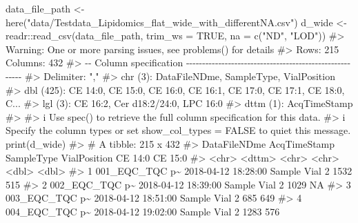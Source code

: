 \documentclass[
  letterpaper,
  DIV=11,
  numbers=noendperiod]{scrreprt}
\newenvironment{Shaded}{\begin{snugshade}}{\end{snugshade}}
\newcommand{\AttributeTok}[1]{\textcolor[rgb]{0.40,0.45,0.13}{#1}}
\newcommand{\CommentTok}[1]{\textcolor[rgb]{0.37,0.37,0.37}{#1}}
\newcommand{\ConstantTok}[1]{\textcolor[rgb]{0.56,0.35,0.01}{#1}}
\newcommand{\FunctionTok}[1]{\textcolor[rgb]{0.28,0.35,0.67}{#1}}
\newcommand{\NormalTok}[1]{\textcolor[rgb]{0.00,0.23,0.31}{#1}}
\newcommand{\OtherTok}[1]{\textcolor[rgb]{0.00,0.23,0.31}{#1}}
\newcommand{\SpecialCharTok}[1]{\textcolor[rgb]{0.37,0.37,0.37}{#1}}
\newcommand{\StringTok}[1]{\textcolor[rgb]{0.13,0.47,0.30}{#1}}
\begin{document}
\begin{Shaded}
\begin{Highlighting}[]
\NormalTok{data\_file\_path }\OtherTok{\textless{}{-}} \FunctionTok{here}\NormalTok{(}\StringTok{"data/Testdata\_Lipidomics\_flat\_wide\_with\_differentNA.csv"}\NormalTok{)}
\NormalTok{d\_wide }\OtherTok{\textless{}{-}}\NormalTok{ readr}\SpecialCharTok{::}\FunctionTok{read\_csv}\NormalTok{(data\_file\_path, }\AttributeTok{trim\_ws =} \ConstantTok{TRUE}\NormalTok{, }\AttributeTok{na =} \FunctionTok{c}\NormalTok{(}\StringTok{"ND"}\NormalTok{, }\StringTok{"LOD"}\NormalTok{))}
\CommentTok{\#\textgreater{} Warning: One or more parsing issues, see \textasciigrave{}problems()\textasciigrave{} for details}
\CommentTok{\#\textgreater{} Rows: 215 Columns: 432}
\CommentTok{\#\textgreater{} {-}{-} Column specification {-}{-}{-}{-}{-}{-}{-}{-}{-}{-}{-}{-}{-}{-}{-}{-}{-}{-}{-}{-}{-}{-}{-}{-}{-}{-}{-}{-}{-}{-}{-}{-}{-}{-}{-}{-}{-}{-}{-}{-}{-}{-}{-}{-}{-}{-}{-}{-}{-}{-}{-}{-}{-}{-}{-}{-}}
\CommentTok{\#\textgreater{} Delimiter: ","}
\CommentTok{\#\textgreater{} chr    (3): DataFileNDme, SampleType, VialPosition}
\CommentTok{\#\textgreater{} dbl  (425): CE 14:0, CE 15:0, CE 16:0, CE 16:1, CE 17:0, CE 17:1, CE 18:0, C...}
\CommentTok{\#\textgreater{} lgl    (3): CE 16:2, Cer d18:2/24:0, LPC 16:0}
\CommentTok{\#\textgreater{} dttm   (1): AcqTimeStamp}
\CommentTok{\#\textgreater{} }
\CommentTok{\#\textgreater{} i Use \textasciigrave{}spec()\textasciigrave{} to retrieve the full column specification for this data.}
\CommentTok{\#\textgreater{} i Specify the column types or set \textasciigrave{}show\_col\_types = FALSE\textasciigrave{} to quiet this message.}
\FunctionTok{print}\NormalTok{(d\_wide)}
\CommentTok{\#\textgreater{} \# A tibble: 215 x 432}
\CommentTok{\#\textgreater{}   DataFileNDme   AcqTimeStamp        SampleType VialPosition \textasciigrave{}CE 14:0\textasciigrave{} \textasciigrave{}CE 15:0\textasciigrave{}}
\CommentTok{\#\textgreater{}   \textless{}chr\textgreater{}          \textless{}dttm\textgreater{}              \textless{}chr\textgreater{}      \textless{}chr\textgreater{}            \textless{}dbl\textgreater{}     \textless{}dbl\textgreater{}}
\CommentTok{\#\textgreater{} 1 001\_EQC\_TQC p\textasciitilde{} 2018{-}04{-}12 18:28:00 Sample     Vial 2            1532       515}
\CommentTok{\#\textgreater{} 2 002\_EQC\_TQC p\textasciitilde{} 2018{-}04{-}12 18:39:00 Sample     Vial 2            1029        NA}
\CommentTok{\#\textgreater{} 3 003\_EQC\_TQC p\textasciitilde{} 2018{-}04{-}12 18:51:00 Sample     Vial 2             685       649}
\CommentTok{\#\textgreater{} 4 004\_EQC\_TQC p\textasciitilde{} 2018{-}04{-}12 19:02:00 Sample     Vial 2            1283       576}

\end{Highlighting}
\end{Shaded}
\end{document}
